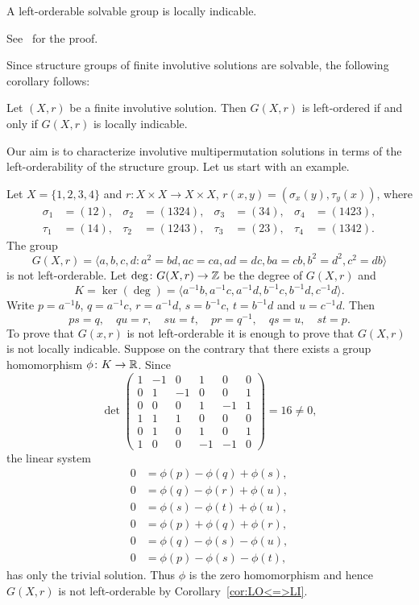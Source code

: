 \begin{theorem}
A left-orderable solvable group is locally indicable.  
\end{theorem}

See~\cite{MR1205890} for the proof. 

Since structure groups of finite involutive solutions are
solvable, the following corollary follows: 

\begin{corollary}
\label{cor:LO<=>LI}
	Let $(X,r)$ be a finite involutive solution. Then $G(X,r)$ is left-ordered if and only if $G(X,r)$ is locally indicable. 
\end{corollary}

Our aim is to characterize involutive multipermutation solutions
in terms of the left-orderability of the structure group. Let us start with an example. 

\begin{example}
\label{exa:Navas}
	Let $X=\{1,2,3,4\}$ and $r\colon X\times X\to X\times X$, $r(x,y)=(\sigma_x(y),\tau_y(x))$, 
	where
	\begin{align*}
	\sigma_1&=(12), &\sigma_2&=(1324), &\sigma_3&=(34), &\sigma_4&=(1423),\\
	\tau_1&=(14),&\tau_2&=(1243),&\tau_3&=(23),&\tau_4&=(1342).	
	\end{align*}
	The group 
	\[
	G(X,r)=\langle a,b,c,d:a^2=bd,ac=ca,ad=dc,ba=cb,b^2=d^2,c^2=db\rangle
	\]
	is not left-orderable. Let $\deg\colon G(X,r)\to\mathbb{Z}$ be the degree of $G(X,r)$ and	
	\[
	K=\ker(\deg)=\langle a^{-1}b,a^{-1}c,a^{-1}d,b^{-1}c,b^{-1}d,c^{-1}d\rangle.
	\]
	Write $p=a^{-1}b$, $q=a^{-1}c$, $r=a^{-1}d$, $s=b^{-1}c$, $t=b^{-1}d$ and $u=c^{-1}d$. Then 
	\[
	ps=q,\quad
	qu=r,\quad
	su=t,\quad
	pr=q^{-1},\quad
	qs=u,\quad
	st=p.
	\]
	To prove that $G(x,r)$ is not left-orderable it is enough to prove that
	$G(X,r)$ is not locally indicable. Suppose on the contrary that
	there exists a group homomorphism $\phi\colon K\to\mathbb{R}$. Since 
	\[
	\det\begin{pmatrix}
		1 & -1 & 0 & 1 & 0 & 0\\
		0 & 1 & -1 & 0 & 0 & 1\\
		0 & 0 & 0 & 1 & -1 & 1\\
		1 & 1 & 1 & 0 & 0 & 0\\
		0 & 1 & 0 & 1 & 0 & 1\\
		1 & 0 & 0 & -1 & -1 & 0	
	\end{pmatrix}
		=16\ne0,
	\]
 	the linear system 
	\begin{align*}
		0 &= \phi(p)-\phi(q)+\phi(s),\\
		0 &= \phi(q)-\phi(r)+\phi(u),\\
		0 &= \phi(s)-\phi(t)+\phi(u),\\
		0 &= \phi(p)+\phi(q)+\phi(r),\\
		0 &= \phi(q)-\phi(s)-\phi(u),\\
		0 &= \phi(p)-\phi(s)-\phi(t),
	\end{align*}
	has only the trivial solution. Thus 
	$\phi$ is the zero homomorphism and hence  
	$G(X,r)$ 
	is not left-orderable by Corollary~\ref{cor:LO<=>LI}. 
\end{example}

